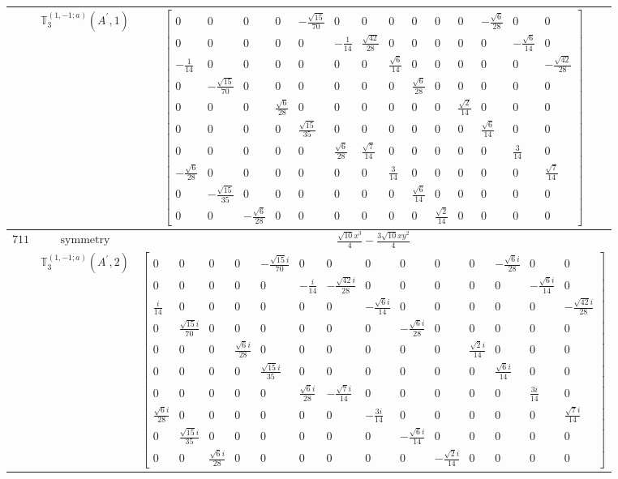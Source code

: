 \documentclass[fleqn,8pt,landscape]{jsarticle}
\begin{document}
\begin{longtable}{ccc}
$  $ & $ \mathbb{T}_{3}^{(1,-1;a)}(A^{\prime},1) $ & $ \begin{bmatrix} 0 & 0 & 0 & 0 & - \frac{\sqrt{15}}{70} & 0 & 0 & 0 & 0 & 0 & 0 & - \frac{\sqrt{6}}{28} & 0 & 0 \\ 0 & 0 & 0 & 0 & 0 & - \frac{1}{14} & \frac{\sqrt{42}}{28} & 0 & 0 & 0 & 0 & 0 & - \frac{\sqrt{6}}{14} & 0 \\ - \frac{1}{14} & 0 & 0 & 0 & 0 & 0 & 0 & \frac{\sqrt{6}}{14} & 0 & 0 & 0 & 0 & 0 & - \frac{\sqrt{42}}{28} \\ 0 & - \frac{\sqrt{15}}{70} & 0 & 0 & 0 & 0 & 0 & 0 & \frac{\sqrt{6}}{28} & 0 & 0 & 0 & 0 & 0 \\ 0 & 0 & 0 & \frac{\sqrt{6}}{28} & 0 & 0 & 0 & 0 & 0 & 0 & \frac{\sqrt{2}}{14} & 0 & 0 & 0 \\ 0 & 0 & 0 & 0 & \frac{\sqrt{15}}{35} & 0 & 0 & 0 & 0 & 0 & 0 & \frac{\sqrt{6}}{14} & 0 & 0 \\ 0 & 0 & 0 & 0 & 0 & \frac{\sqrt{6}}{28} & \frac{\sqrt{7}}{14} & 0 & 0 & 0 & 0 & 0 & \frac{3}{14} & 0 \\ - \frac{\sqrt{6}}{28} & 0 & 0 & 0 & 0 & 0 & 0 & \frac{3}{14} & 0 & 0 & 0 & 0 & 0 & \frac{\sqrt{7}}{14} \\ 0 & - \frac{\sqrt{15}}{35} & 0 & 0 & 0 & 0 & 0 & 0 & \frac{\sqrt{6}}{14} & 0 & 0 & 0 & 0 & 0 \\ 0 & 0 & - \frac{\sqrt{6}}{28} & 0 & 0 & 0 & 0 & 0 & 0 & \frac{\sqrt{2}}{14} & 0 & 0 & 0 & 0 \end{bmatrix} $ \\ \hline
$ 711 $ & $ \text{symmetry} $ & $ \frac{\sqrt{10} x^{3}}{4} - \frac{3 \sqrt{10} x y^{2}}{4} $ \\
$  $ & $ \mathbb{T}_{3}^{(1,-1;a)}(A^{\prime},2) $ & $ \begin{bmatrix} 0 & 0 & 0 & 0 & - \frac{\sqrt{15} i}{70} & 0 & 0 & 0 & 0 & 0 & 0 & - \frac{\sqrt{6} i}{28} & 0 & 0 \\ 0 & 0 & 0 & 0 & 0 & - \frac{i}{14} & - \frac{\sqrt{42} i}{28} & 0 & 0 & 0 & 0 & 0 & - \frac{\sqrt{6} i}{14} & 0 \\ \frac{i}{14} & 0 & 0 & 0 & 0 & 0 & 0 & - \frac{\sqrt{6} i}{14} & 0 & 0 & 0 & 0 & 0 & - \frac{\sqrt{42} i}{28} \\ 0 & \frac{\sqrt{15} i}{70} & 0 & 0 & 0 & 0 & 0 & 0 & - \frac{\sqrt{6} i}{28} & 0 & 0 & 0 & 0 & 0 \\ 0 & 0 & 0 & \frac{\sqrt{6} i}{28} & 0 & 0 & 0 & 0 & 0 & 0 & \frac{\sqrt{2} i}{14} & 0 & 0 & 0 \\ 0 & 0 & 0 & 0 & \frac{\sqrt{15} i}{35} & 0 & 0 & 0 & 0 & 0 & 0 & \frac{\sqrt{6} i}{14} & 0 & 0 \\ 0 & 0 & 0 & 0 & 0 & \frac{\sqrt{6} i}{28} & - \frac{\sqrt{7} i}{14} & 0 & 0 & 0 & 0 & 0 & \frac{3 i}{14} & 0 \\ \frac{\sqrt{6} i}{28} & 0 & 0 & 0 & 0 & 0 & 0 & - \frac{3 i}{14} & 0 & 0 & 0 & 0 & 0 & \frac{\sqrt{7} i}{14} \\ 0 & \frac{\sqrt{15} i}{35} & 0 & 0 & 0 & 0 & 0 & 0 & - \frac{\sqrt{6} i}{14} & 0 & 0 & 0 & 0 & 0 \\ 0 & 0 & \frac{\sqrt{6} i}{28} & 0 & 0 & 0 & 0 & 0 & 0 & - \frac{\sqrt{2} i}{14} & 0 & 0 & 0 & 0 \end{bmatrix} $ \\ \hline

\end{longtable}
\end{document}
